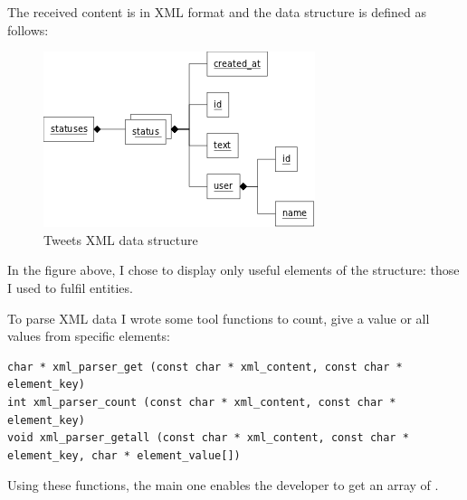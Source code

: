 The received content is in XML format and the data structure is defined as follows:

\begin{figure}[h]
  \centering
  \includegraphics[scale=0.75]{images/xml.png}
  \caption{Tweets XML data structure}
\end{figure}
In the figure above, I chose to display only useful elements of the structure: those I used to fulfil  entities.

To parse XML data I wrote some tool functions to count, give a value or all values from specific elements:
\begin{lstlisting}
char * xml_parser_get (const char * xml_content, const char * element_key)
int xml_parser_count (const char * xml_content, const char * element_key)
void xml_parser_getall (const char * xml_content, const char * element_key, char * element_value[])
\end{lstlisting}

Using these functions, the main one enables the developer to get an array of .

\clearpage
